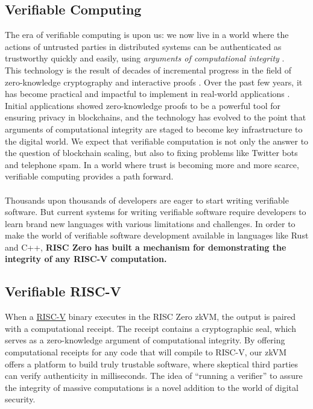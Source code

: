 \documentclass[10pt,letterpaper,titlepage]{article}
\theoremstyle{definition}
\begin{document}
\subsection{Verifiable Computing}
The era of verifiable computing is upon us: we now live in a world where the actions of untrusted parties in distributed systems can be authenticated as trustworthy quickly and easily, using \textit{arguments of computational integrity} \cite{stark}. \\
This technology is the result of decades of incremental progress in the field of zero-knowledge cryptography and interactive proofs \cite{zkp,pcp,iop}. 
Over the past few years, it has become practical and impactful to implement in real-world applications \cite{zcash,ethSTARK}. 
Initial applications showed zero-knowledge proofs to be a powerful tool for ensuring privacy in blockchains, and the technology has evolved to the point that arguments of computational integrity are staged to become key infrastructure to the digital world.
We expect that verifiable computation is not only the answer to the question of blockchain scaling, but also to fixing problems like Twitter bots and telephone spam. 
In a world where trust is becoming more and more scarce, verifiable computing provides a path forward. \\
\\
Thousands upon thousands of developers are eager to start writing verifiable software.
But current systems for writing verifiable software require developers to learn brand new languages with various limitations and challenges. 
In order to make the world of verifiable software development available in languages like Rust and C++, \textbf{RISC Zero has built a mechanism for demonstrating the integrity of any RISC-V computation.} 

\subsection{Verifiable RISC-V}
When a \href{https://riscv.org/} {RISC-V} binary executes in the RISC Zero zkVM, the output is paired with a computational receipt.
The receipt contains a cryptographic seal, which serves as a zero-knowledge argument of computational integrity. 
By offering computational receipts for any code that will compile to RISC-V, our zkVM offers a platform to build truly trustable software, where skeptical third parties can verify authenticity in milliseconds. The idea of ``running a verifier'' to assure the integrity of massive computations is a novel addition to the world of digital security.
\end{document}
